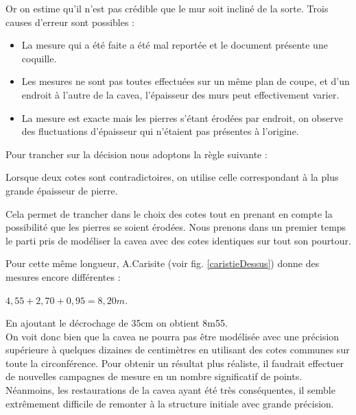 Or on estime qu'il n'est pas crédible que le mur soit incliné de la sorte. Trois causes d'erreur sont possibles :
\begin{itemize}
	\item La mesure qui a été faite a été mal reportée et le document présente une coquille.
	\item Les mesures ne sont pas toutes effectuées sur un même plan de coupe, et d'un endroit à l'autre de la  \gls{cavea}, l'épaisseur des murs peut effectivement varier.
	\item La mesure est exacte mais les pierres s'étant érodées par endroit, on observe des fluctuations d'épaisseur qui n'étaient pas présentes à l'origine.
\end{itemize}

Pour trancher sur la décision nous adoptons la règle suivante :

\begin{theo}\label{epaisseur}
	Lorsque deux cotes sont contradictoires, on utilise celle correspondant à la plus grande épaisseur de pierre.
\end{theo}

Cela permet de trancher dans le choix des cotes tout en prenant en compte la possibilité que les pierres se soient érodées. Nous prenons dans un premier temps le parti pris de modéliser la  \gls{cavea} avec des cotes identiques sur tout son pourtour. 

Pour cette même longueur, A.Carisite (voir fig. \ref{caristieDessus}) donne des mesures encore différentes : 
\begin{center}
$4,55+2,70+0,95=8,20m$.
\end{center}
En ajoutant le décrochage de 35cm on obtient 8m55. \\

On voit donc bien que la \gls{cavea} ne pourra pas être modélisée avec une précision supérieure à quelques dizaines de centimètres en utilisant des cotes communes sur toute la circonférence. Pour obtenir un résultat plus réaliste, il faudrait effectuer de nouvelles campagnes de mesure en un nombre significatif de points. Néanmoins, les restaurations de la \gls{cavea} ayant été très conséquentes, il semble extrêmement difficile de remonter à la structure initiale avec grande précision.


